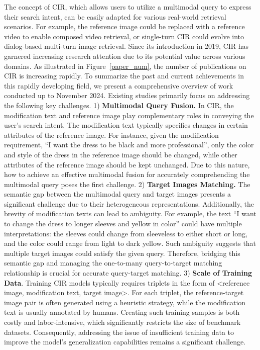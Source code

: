 The concept of CIR, which allows users to utilize a multimodal query to express their search intent, can be easily adapted for various real-world retrieval scenarios. For example, the reference image could be replaced with a reference video to enable composed video retrieval, or single-turn CIR could evolve into dialog-based multi-turn image retrieval. Since its introduction in 2019, CIR has garnered increasing research attention due to its potential value across various domains. As illustrated in Figure~\ref{paper_num}, the number of publications on CIR is increasing rapidly. 
To summarize the past and current achievements in this rapidly developing field, we present a comprehensive overview of work conducted up to November 2024. Existing studies primarily focus on addressing the following key challenges.
1) \textbf{Multimodal Query Fusion.} In CIR, the modification text and reference image play complementary roles in conveying the user's search intent. The modification text typically specifies changes in certain attributes of the reference image. For instance, given the modification requirement, ``I want the dress to be black and more professional'', only the color and style of the dress in the reference image should be changed, while other attributes of the reference image should be kept unchanged. Due to this nature, how to achieve an effective multimodal fusion for accurately comprehending the multimodal query poses the first challenge.
2) \textbf{Target Images Matching.} The semantic gap between the multimodal query and target images presents a significant challenge due to their heterogeneous representations. Additionally, the brevity of modification texts can lead to ambiguity. For example, the text ``I want to change the dress to longer sleeves and yellow in color'' could have multiple interpretations: the sleeves could change from sleeveless to either short or long, and the color could range from light to dark yellow. Such ambiguity suggests that multiple target images could satisfy the given query. Therefore, bridging this semantic gap and managing the one-to-many query-to-target matching relationship is crucial for accurate query-target matching.
3) \textbf{Scale of Training Data}. Training CIR models typically requires triplets in the form of <reference image, modification text, target image>. For each triplet, the reference-target image pair is often generated using a heuristic strategy, while the modification text is usually annotated by humans. Creating such training samples is both costly and labor-intensive, which significantly restricts the size of benchmark datasets. Consequently, addressing the issue of insufficient training data to improve the model's generalization capabilities remains a significant challenge.


